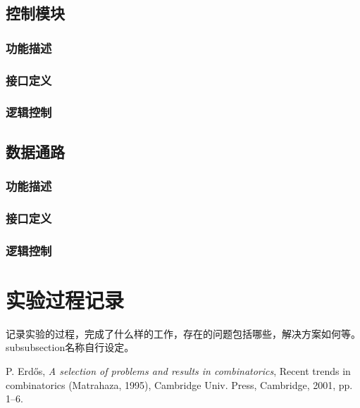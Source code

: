 \documentclass[UTF8]{ctexart}
\begin{document}
\subsection{控制模块}\label{sub:ctl}
\subsubsection{功能描述}
\subsubsection{接口定义}
\subsubsection{逻辑控制}

\subsection{数据通路}\label{sub:dat}
\subsubsection{功能描述}
\subsubsection{接口定义}
\subsubsection{逻辑控制}


\section{实验过程记录}\label{labrec}
记录实验的过程，完成了什么样的工作，存在的问题包括哪些，解决方案如何等。subsubsection名称自行设定。

\appendix

\newpage
\begin{thebibliography}{9}
 P. Erd\H os, \emph{A selection of problems and
results in combinatorics}, Recent trends in combinatorics (Matrahaza,
1995), Cambridge Univ. Press, Cambridge, 2001, pp. 1--6.
\end{thebibliography}
\end{document}
